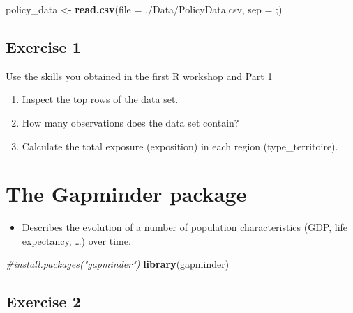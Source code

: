 \documentclass[
]{book}
\newenvironment{Shaded}{\begin{snugshade}}{\end{snugshade}}
\newcommand{\AttributeTok}[1]{\textcolor[rgb]{0.13,0.29,0.53}{#1}}
\newcommand{\CommentTok}[1]{\textcolor[rgb]{0.56,0.35,0.01}{\textit{#1}}}
\newcommand{\FunctionTok}[1]{\textcolor[rgb]{0.13,0.29,0.53}{\textbf{#1}}}
\newcommand{\NormalTok}[1]{#1}
\newcommand{\OtherTok}[1]{\textcolor[rgb]{0.56,0.35,0.01}{#1}}
\newcommand{\StringTok}[1]{\textcolor[rgb]{0.31,0.60,0.02}{#1}}
\providecommand{\tightlist}{%
  \setlength{\itemsep}{0pt}\setlength{\parskip}{0pt}}
\begin{document}
\begin{Shaded}
\begin{Highlighting}[]
\NormalTok{policy\_data }\OtherTok{\textless{}{-}} \FunctionTok{read.csv}\NormalTok{(}\AttributeTok{file =} \StringTok{\textquotesingle{}./Data/PolicyData.csv\textquotesingle{}}\NormalTok{, }\AttributeTok{sep =} \StringTok{\textquotesingle{};\textquotesingle{}}\NormalTok{)}
\end{Highlighting}
\end{Shaded}

\subsection*{Exercise 1}\label{exercise-1-5}

Use the skills you obtained in the first R workshop and Part 1

\begin{enumerate}
\def\labelenumi{\arabic{enumi}.}
\tightlist
\item
  Inspect the top rows of the data set.
\item
  How many observations does the data set contain?
\item
  Calculate the total exposure (exposition) in each region
  (type\_territoire).
\end{enumerate}

\section*{The Gapminder package}\label{the-gapminder-package}

\begin{itemize}
\tightlist
\item
  Describes the evolution of a number of population characteristics
  (GDP, life expectancy, \ldots) over time.
\end{itemize}

\begin{Shaded}
\begin{Highlighting}[]
\CommentTok{\#install.packages("gapminder")}
\FunctionTok{library}\NormalTok{(gapminder)}
\end{Highlighting}
\end{Shaded}

\subsection*{Exercise 2}\label{exercise-2-4}
\end{document}
